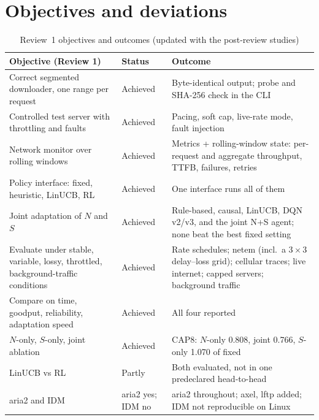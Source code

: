 \section{Objectives and deviations}
\begin{table}[H]\centering\small
\caption{Review~1 objectives and outcomes (updated with the post-review studies)}\label{tab:objectives}
\begin{tabularx}{\linewidth}{@{}P{5.0cm}P{1.7cm}L@{}}
\toprule
\textbf{Objective (Review 1)} & \textbf{Status} & \textbf{Outcome}\\
\midrule
Correct segmented downloader, one range per request & Achieved & Byte-identical output; probe and SHA-256 check in the CLI\\
Controlled test server with throttling and faults & Achieved & Pacing, soft cap, live-rate mode, fault injection\\
Network monitor over rolling windows & Achieved & Metrics + rolling-window state: per-request and aggregate throughput, TTFB, failures, retries\\
Policy interface: fixed, heuristic, LinUCB, RL & Achieved & One interface runs all of them\\
Joint adaptation of $N$ and $S$ & Achieved & Rule-based, causal, LinUCB, DQN v2/v3, and the joint N+S agent; none beat the best fixed setting\\
Evaluate under stable, variable, lossy, throttled, background-traffic conditions & Achieved & Rate schedules; netem (incl.\ a $3\times3$ delay--loss grid); cellular traces; live internet; capped servers;  background traffic\\
Compare on time, goodput, reliability, adaptation speed & Achieved & All four reported\\
$N$-only, $S$-only, joint ablation & Achieved & CAP8: $N$-only 0.808, joint 0.766, $S$-only 1.070 of fixed\\
LinUCB vs RL & Partly & Both evaluated, not in one predeclared head-to-head\\
aria2 and IDM & aria2 yes; IDM no & aria2 throughout; axel, lftp added; IDM not reproducible on Linux\\
\bottomrule
\end{tabularx}
\end{table}


